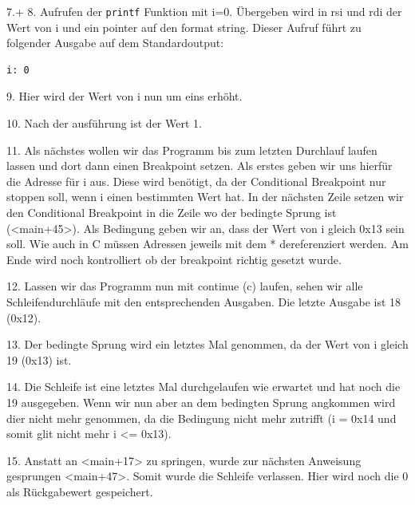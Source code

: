 \documentclass[12pt]{article}
\begin{document}

7.+ 8. Aufrufen der \texttt{printf} Funktion mit i=0. Übergeben wird in rsi und rdi der Wert von i und ein pointer auf den format string. Dieser Aufruf führt zu folgender Ausgabe auf dem Standardoutput:

\begin{lstlisting}
i: 0
\end{lstlisting}


9. Hier wird der Wert von i nun um eins erhöht.


10. Nach der ausführung ist der Wert 1.


11. Als nächstes wollen wir das Programm bis zum letzten Durchlauf laufen lassen und dort dann einen Breakpoint setzen. Als erstes geben wir uns hierfür die Adresse für i aus. Diese wird benötigt, da der Conditional Breakpoint nur stoppen soll, wenn i einen bestimmten Wert hat. In der nächsten Zeile setzen wir den Conditional Breakpoint in die Zeile wo der bedingte Sprung ist (<main+45>). Als Bedingung geben wir an, dass der Wert von i gleich 0x13 sein soll. Wie auch in C müssen Adressen jeweils mit dem * dereferenziert werden. Am Ende wird noch kontrolliert ob der breakpoint richtig gesetzt wurde.


12. Lassen wir das Programm nun mit continue (c) laufen, sehen wir alle Schleifendurchläufe mit den entsprechenden Ausgaben. Die letzte Ausgabe ist 18 (0x12).


13. Der bedingte Sprung wird ein letztes Mal genommen, da der Wert von i gleich 19 (0x13) ist.


14. Die Schleife ist eine letztes Mal durchgelaufen wie erwartet und hat noch die 19 ausgegeben. Wenn wir nun aber an dem bedingten Sprung angkommen wird dier nicht mehr genommen, da die Bedingung nicht mehr zutrifft (i = 0x14 und somit glit nicht mehr i <= 0x13).


15. Anstatt an <main+17> zu springen, wurde zur nächsten Anweisung gesprungen <main+47>. Somit wurde die Schleife verlassen. Hier wird noch die 0 als Rückgabewert gespeichert. 
\end{document}
